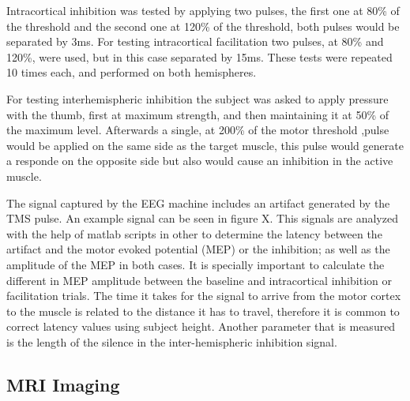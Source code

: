 
Intracortical inhibition was tested by applying two pulses, the first one at 80\% of the threshold and the second one at 120\% of the threshold, both pulses would be separated by 3ms. For testing intracortical facilitation two pulses, at 80\% and 120\%, were used, but in this case separated by 15ms. These tests were repeated 10 times each, and performed on both hemispheres.

For testing interhemispheric inhibition the subject was asked to apply pressure with the thumb, first at maximum strength, and then maintaining it at 50\% of the maximum level. Afterwards a single, at 200\% of the motor threshold ,pulse would be applied on the same side as the target muscle, this pulse would generate a responde on the opposite side but also would cause an inhibition in the active muscle. 

The signal captured by the EEG machine includes an artifact generated by the TMS pulse. An example signal can be seen in figure X. This signals are analyzed with the help of matlab scripts in other to determine the latency between the artifact and the motor evoked potential (MEP) or the inhibition; as well as the amplitude of the MEP in both cases. It is specially important to calculate the different in MEP amplitude between the baseline and intracortical inhibition or facilitation trials. The time it takes for the signal to arrive from the motor cortex to the muscle is related to the distance it has to travel, therefore it is common to correct latency values using subject height. Another parameter that is measured is the length of the silence in the inter-hemispheric inhibition signal.


\subsection{MRI Imaging}



